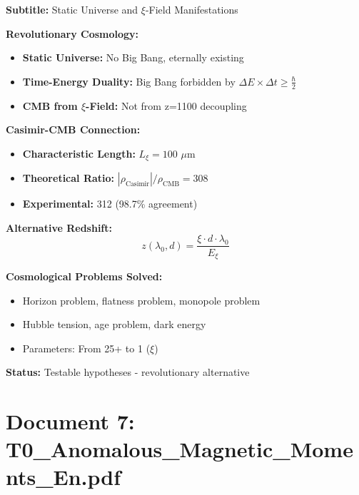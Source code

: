 \documentclass[12pt,a4paper]{article}
\newcommand{\xipar}{\xi}
\begin{document}
	\begin{documentbox}
		\textbf{Subtitle:} Static Universe and $\xi$-Field Manifestations
		
		\textbf{Revolutionary Cosmology:}
		\begin{itemize}
			\item \textbf{Static Universe:} No Big Bang, eternally existing
			\item \textbf{Time-Energy Duality:} Big Bang forbidden by $\Delta E \times \Delta t \geq \frac{\hbar}{2}$
			\item \textbf{CMB from $\xi$-Field:} Not from z=1100 decoupling
		\end{itemize}
		
		\textbf{Casimir-CMB Connection:}
		\begin{itemize}
			\item \textbf{Characteristic Length:} $L_\xi = 100$ $\mu$m
			\item \textbf{Theoretical Ratio:} $|\rho_{\text{Casimir}}|/\rho_{\text{CMB}} = 308$
			\item \textbf{Experimental:} 312 (98.7\% agreement)
		\end{itemize}
		
		\textbf{Alternative Redshift:}
		\begin{equation}
			z(\lambda_0, d) = \frac{\xipar \cdot d \cdot \lambda_0}{E_\xi}
		\end{equation}
		
		\textbf{Cosmological Problems Solved:}
		\begin{itemize}
			\item Horizon problem, flatness problem, monopole problem
			\item Hubble tension, age problem, dark energy
			\item Parameters: From 25+ to 1 ($\xipar$)
		\end{itemize}
		
		\textbf{Status:} Testable hypotheses - revolutionary alternative
	\end{documentbox}
	
	\section{Document 7: T0\_Anomalous\_Magnetic\_Moments\_En.pdf}
	
\end{document}
